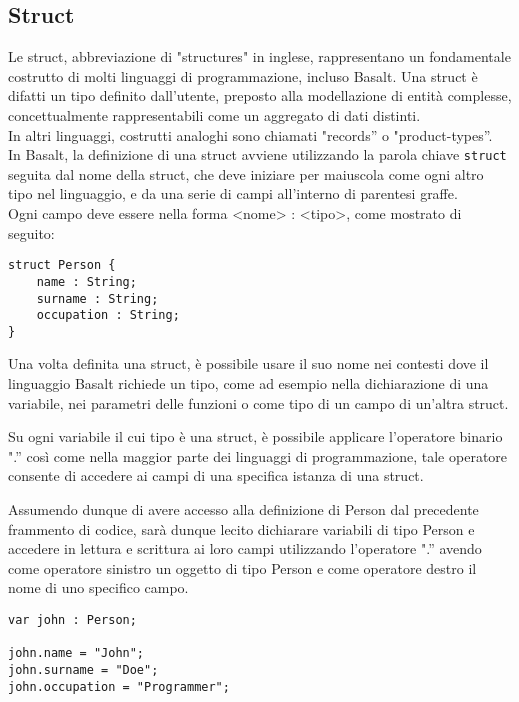 \subsection{Struct}
Le struct, abbreviazione di "structures" in inglese, rappresentano un fondamentale costrutto di molti 
linguaggi di programmazione, incluso Basalt. Una struct è difatti un tipo definito dall’utente, preposto alla 
modellazione di entità complesse, concettualmente rappresentabili come un aggregato di dati distinti. \\

In altri linguaggi, costrutti analoghi sono chiamati "records” o "product-types”. \\

In Basalt, la definizione di una struct avviene utilizzando la parola chiave \texttt{struct} seguita dal nome della struct, 
che deve iniziare per maiuscola come ogni altro tipo nel linguaggio, e da una serie di campi all'interno di parentesi graffe. \\

Ogni campo deve essere nella forma <nome> : <tipo>, come mostrato di seguito:

\vspace{0.5cm}
\begin{lstlisting}[frame=single]
struct Person {
    name : String;
    surname : String;
    occupation : String;
}
\end{lstlisting}
\vspace{0.5cm}


Una volta definita una struct, è possibile usare il suo nome nei contesti dove il linguaggio Basalt richiede un tipo, come ad esempio nella dichiarazione di una variabile, 
nei parametri delle funzioni o come tipo di un campo di un’altra struct. 

Su ogni variabile il cui tipo è una struct, è possibile applicare l’operatore binario ".” così come nella maggior parte dei linguaggi di 
programmazione, tale operatore consente di accedere ai campi di una specifica istanza di una struct. 

Assumendo dunque di avere accesso alla definizione di Person dal precedente frammento di codice, sarà dunque 
lecito dichiarare variabili di tipo Person e accedere in lettura e scrittura ai loro campi utilizzando l’operatore ".” 
avendo come operatore sinistro un oggetto di tipo Person e come operatore destro il nome di uno specifico campo.

\vspace{0.5cm}
\begin{lstlisting}[frame=single]
var john : Person;

john.name = "John";
john.surname = "Doe";
john.occupation = "Programmer";
\end{lstlisting}
\vspace{0.5cm}

\newpage
 \newpage
 \newpage